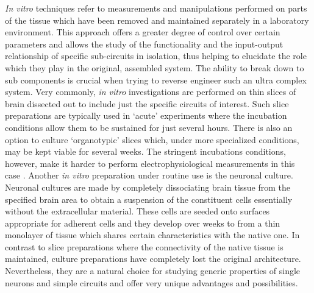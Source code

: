     \textit{In vitro} techniques refer to measurements and manipulations performed on parts of the tissue which have been removed and maintained separately in a laboratory environment. This approach offers a greater degree of control over certain parameters and allows the study of the functionality and the input-output relationship of specific sub-circuits in isolation, thus helping to elucidate the role which they play in the original, assembled system. The ability to break down to sub components is crucial when trying to reverse engineer such an ultra complex system. Very commonly, \textit{in vitro} investigations are performed on thin slices of brain dissected out to include just the specific circuits of interest. Such slice preparations are typically used in `acute' experiments where the incubation conditions allow them to be sustained for just several hours. There is also an option to culture `organotypic' slices which, under more specialized conditions, may be kept viable for several weeks. The stringent incubations conditions, however, make it harder to perform electrophysiological measurements in this case \cite{lossi2009cell}. Another \textit{in vitro} preparation under routine use is the neuronal culture. Neuronal cultures are made by completely dissociating brain tissue from the specified brain area to obtain a suspension of the constituent cells essentially without the extracellular material. These cells are seeded onto surfaces appropriate for adherent cells and they develop over weeks to from a thin monolayer of tissue which shares certain characteristics with the native one. In contrast to slice preparations where the connectivity of the native tissue is maintained, culture preparations have completely lost the original architecture. Nevertheless, they are a natural choice for studying generic properties of single neurons and simple circuits and offer very unique advantages and possibilities.

